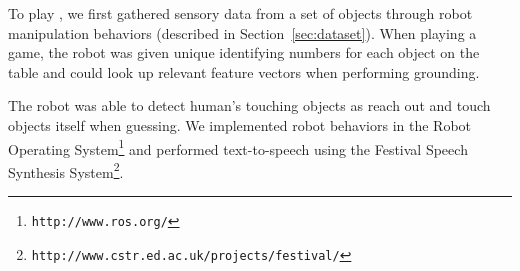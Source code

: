 To play \ispy, we first gathered sensory data from a set of objects through robot manipulation behaviors (described in Section~\ref{sec:dataset}).
When playing a game, the robot was given unique identifying numbers for each object on the table and could look up relevant feature vectors when performing grounding.

The robot was able to detect human's touching objects as reach out and touch objects itself when guessing.
We implemented robot behaviors in the Robot Operating System\footnote{\texttt{http://www.ros.org/}} and performed text-to-speech using the Festival Speech Synthesis System\footnote{\texttt{http://www.cstr.ed.ac.uk/projects/festival/}}.